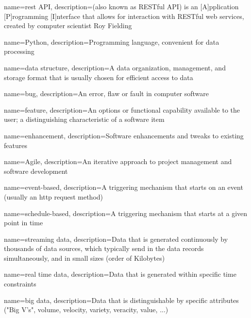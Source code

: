 {
    name={\acrshort{rest} API},
    description={(also known as RESTful API) is an [A]pplication [P]rogramming [I]nterface that allows for interaction with RESTful web services, created by computer scientist Roy Fielding \cite{redhat2022}}
}

{
    name=Python,
    description={Programming language, convenient for data processing}
}


{
    name={data structure},
    description={A data organization, management, and storage format that is usually chosen for efficient access to data \cite{algintro2009}}
}

{
    name=bug,
    description={An error, flaw or fault in computer software}
}

{
    name=feature,
    description={An options or functional capability available to the user; a distinguishing characteristic of a software item}
}

{
    name=enhancement,
    description={Software enhancements and tweaks to existing \glspl{feature}}
}

{
    name=Agile,
    description={An iterative approach to project management and software development \cite{atlassian2022agile}}
}

{
    name={event-based},
    description={A triggering mechanism that starts on an event (usually an \acrshort{http} request method)}
}

{
    name={schedule-based},
    description={A triggering mechanism that starts at a given point in time}
}

{
    name={streaming data},
    description={Data that is generated continuously by thousands of data sources, which typically send in the data records simultaneously, and in small sizes (order of Kilobytes) \cite{aws2022streamingdata}}
}

{
    name={real time data},
    description={Data that is generated within specific time constraints \cite{medium2022wang}}
}

{
    name={big data},
    description={Data that is distinguishable by specific attributes ("Big V's", volume, velocity, variety, veracity, value, ...) \cite{bigdataplatforms2016} }
}

